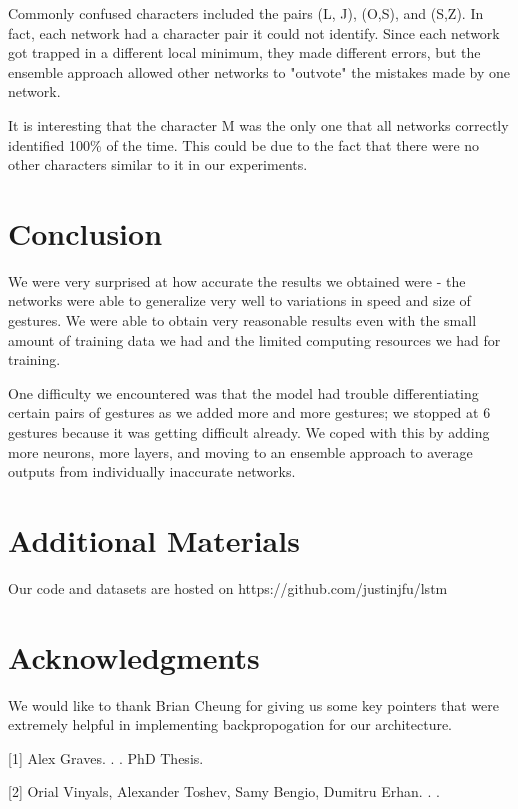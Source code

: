 \documentclass[11pt]{article}
\begin{document}
Commonly confused characters included the pairs (L, J), (O,S), 
and (S,Z). In fact, each network had a character pair it 
could not identify. Since each network got trapped in a
different local minimum, they made different errors, 
but the ensemble approach allowed other networks to
"outvote" the mistakes made by one network.

It is interesting that the character M was the only
one that all networks correctly identified 100\% of the time.
This could be due to the fact that there were no other
characters similar to it in our experiments.

\section{Conclusion}

We were very surprised at how accurate the results
we obtained were - 
the networks were able to generalize very well
to variations in speed and size of gestures. We
were able to obtain very reasonable results
even with the small amount of training data we had
and the limited computing resources we had for
training.

One difficulty we encountered was that the model
had trouble differentiating certain pairs of gestures
as we added more and more gestures;
we stopped at 6 gestures because it was getting
difficult already. We coped with this by adding
more neurons, more layers, and moving to an ensemble
approach to average outputs from individually
inaccurate networks.

\section*{Additional Materials}

Our code and datasets are hosted on 
https://github.com/justinjfu/lstm

\section*{Acknowledgments}

We would like to thank Brian Cheung for giving us
some key pointers that were
extremely helpful in implementing backpropogation
for our architecture.

\begin{thebibliography}{}

[1]
Alex Graves.
.
.
\newblock PhD Thesis.

[2]
Orial Vinyals, Alexander Toshev, Samy Bengio, Dumitru Erhan.
.
.

\end{thebibliography}
\end{document}
